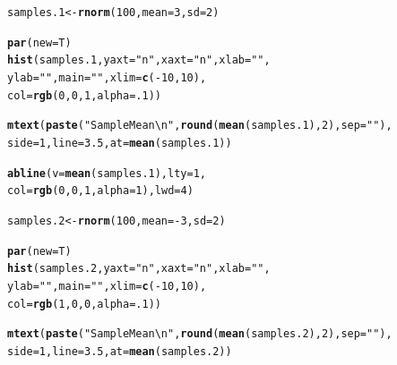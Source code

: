\documentclass{tufte-book}\usepackage[]{graphicx}\usepackage[]{color}
\makeatletter
\newcommand{\hlnum}[1]{\textcolor[rgb]{0.686,0.059,0.569}{#1}}%
\newcommand{\hlstr}[1]{\textcolor[rgb]{0.192,0.494,0.8}{#1}}%
\newcommand{\hlopt}[1]{\textcolor[rgb]{0,0,0}{#1}}%
\newcommand{\hlstd}[1]{\textcolor[rgb]{0.345,0.345,0.345}{#1}}%
\newcommand{\hlkwb}[1]{\textcolor[rgb]{0.69,0.353,0.396}{#1}}%
\newcommand{\hlkwc}[1]{\textcolor[rgb]{0.333,0.667,0.333}{#1}}%
\newcommand{\hlkwd}[1]{\textcolor[rgb]{0.737,0.353,0.396}{\textbf{#1}}}%
\newenvironment{kframe}{%
 \def\at@end@of@kframe{}%
 \ifinner\ifhmode%
  \def\at@end@of@kframe{\end{minipage}}%
  \begin{minipage}{\columnwidth}%
 \fi\fi%
 \def\FrameCommand##1{\hskip\@totalleftmargin \hskip-\fboxsep
 \colorbox{shadecolor}{##1}\hskip-\fboxsep
     \hskip-\linewidth \hskip-\@totalleftmargin \hskip\columnwidth}%
 \MakeFramed {\advance\hsize-\width
   \@totalleftmargin\z@ \linewidth\hsize
   \@setminipage}}%
 {\par\unskip\endMakeFramed%
 \at@end@of@kframe}
\newenvironment{knitrout}{}{} %
\makeatother
\begin{document}
\begin{footnotesize}
\begin{marginfigure}
\begin{tiny}
\begin{knitrout}
\begin{kframe}
\begin{alltt}
\hlstd{samples.1} \hlkwb{<-} \hlkwd{rnorm}\hlstd{(}\hlnum{100}\hlstd{,} \hlkwc{mean} \hlstd{=} \hlnum{3}\hlstd{,} \hlkwc{sd} \hlstd{=} \hlnum{2}\hlstd{)}

\hlkwd{par}\hlstd{(}\hlkwc{new} \hlstd{= T)}
\hlkwd{hist}\hlstd{(samples.1,} \hlkwc{yaxt} \hlstd{=} \hlstr{"n"}\hlstd{,} \hlkwc{xaxt} \hlstd{=} \hlstr{"n"}\hlstd{,} \hlkwc{xlab} \hlstd{=} \hlstr{""}\hlstd{,}
     \hlkwc{ylab} \hlstd{=} \hlstr{""}\hlstd{,} \hlkwc{main} \hlstd{=} \hlstr{""}\hlstd{,} \hlkwc{xlim} \hlstd{=} \hlkwd{c}\hlstd{(}\hlopt{-}\hlnum{10}\hlstd{,} \hlnum{10}\hlstd{),}
     \hlkwc{col} \hlstd{=} \hlkwd{rgb}\hlstd{(}\hlnum{0}\hlstd{,} \hlnum{0}\hlstd{,} \hlnum{1}\hlstd{,} \hlkwc{alpha} \hlstd{=} \hlnum{.1}\hlstd{))}

\hlkwd{mtext}\hlstd{(}\hlkwd{paste}\hlstd{(}\hlstr{"Sample Mean\textbackslash{}n"}\hlstd{,} \hlkwd{round}\hlstd{(}\hlkwd{mean}\hlstd{(samples.1),} \hlnum{2}\hlstd{),} \hlkwc{sep} \hlstd{=} \hlstr{""}\hlstd{),}
      \hlkwc{side} \hlstd{=} \hlnum{1}\hlstd{,} \hlkwc{line} \hlstd{=} \hlnum{3.5}\hlstd{,} \hlkwc{at} \hlstd{=} \hlkwd{mean}\hlstd{(samples.1))}

\hlkwd{abline}\hlstd{(}\hlkwc{v} \hlstd{=} \hlkwd{mean}\hlstd{(samples.1),} \hlkwc{lty} \hlstd{=} \hlnum{1}\hlstd{,}
       \hlkwc{col} \hlstd{=} \hlkwd{rgb}\hlstd{(}\hlnum{0}\hlstd{,} \hlnum{0}\hlstd{,} \hlnum{1}\hlstd{,} \hlkwc{alpha} \hlstd{=} \hlnum{1}\hlstd{),} \hlkwc{lwd} \hlstd{=} \hlnum{4}\hlstd{)}

\hlstd{samples.2} \hlkwb{<-} \hlkwd{rnorm}\hlstd{(}\hlnum{100}\hlstd{,} \hlkwc{mean} \hlstd{=} \hlopt{-}\hlnum{3}\hlstd{,} \hlkwc{sd} \hlstd{=} \hlnum{2}\hlstd{)}

\hlkwd{par}\hlstd{(}\hlkwc{new} \hlstd{= T)}
\hlkwd{hist}\hlstd{(samples.2,} \hlkwc{yaxt} \hlstd{=} \hlstr{"n"}\hlstd{,} \hlkwc{xaxt} \hlstd{=} \hlstr{"n"}\hlstd{,} \hlkwc{xlab} \hlstd{=} \hlstr{""}\hlstd{,}
     \hlkwc{ylab} \hlstd{=} \hlstr{""}\hlstd{,} \hlkwc{main} \hlstd{=} \hlstr{""}\hlstd{,} \hlkwc{xlim} \hlstd{=} \hlkwd{c}\hlstd{(}\hlopt{-}\hlnum{10}\hlstd{,} \hlnum{10}\hlstd{),}
     \hlkwc{col} \hlstd{=} \hlkwd{rgb}\hlstd{(}\hlnum{1}\hlstd{,} \hlnum{0}\hlstd{,} \hlnum{0}\hlstd{,} \hlkwc{alpha} \hlstd{=} \hlnum{.1}\hlstd{))}

\hlkwd{mtext}\hlstd{(}\hlkwd{paste}\hlstd{(}\hlstr{"Sample Mean\textbackslash{}n"}\hlstd{,} \hlkwd{round}\hlstd{(}\hlkwd{mean}\hlstd{(samples.2),} \hlnum{2}\hlstd{),} \hlkwc{sep} \hlstd{=} \hlstr{""}\hlstd{),}
      \hlkwc{side} \hlstd{=} \hlnum{1}\hlstd{,} \hlkwc{line} \hlstd{=} \hlnum{3.5}\hlstd{,} \hlkwc{at} \hlstd{=} \hlkwd{mean}\hlstd{(samples.2))}


\end{alltt}
\end{kframe}
\end{knitrout}
\end{tiny}
\end{marginfigure}
\end{footnotesize}
\end{document}
